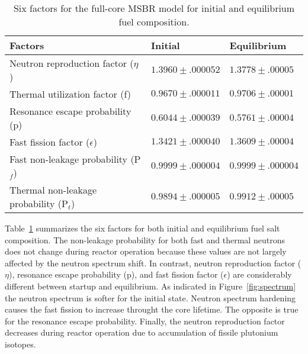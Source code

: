 \begin{table}[ht!]
  \centering
  \caption{Six factors for the full-core \gls{MSBR} model for initial and equilibrium fuel composition.}
\begin{tabular}{| m{} | m{} | m{} |} \hline
	   \qquad\qquad\qquad Factors  & \qquad\qquad Initial      & \qquad Equilibrium   \\ [3pt]\hline   
Neutron reproduction factor ($\eta$)     & $1.3960\pm.000052$     & $1.3778\pm.00005$ \\ [3pt] \hline
Thermal utilization factor (f)           & $0.9670\pm.000011$     & $0.9706\pm.00001$ \\ [3pt] \hline
Resonance escape probability (p)         & $0.6044\pm.000039$     & $0.5761\pm.00004$ \\ [3pt] \hline
Fast fission factor ($\epsilon$)         & $1.3421\pm.000040$     & $1.3609\pm.00004$ \\ [3pt] \hline
Fast non-leakage probability (P$_f$)     & $0.9999\pm.000004$     & $0.9999\pm.000004$ \\ [3pt] \hline
Thermal non-leakage probability (P$_t$)  & $0.9894\pm.000005$     & $0.9912\pm.00005$ \\ [3pt] \hline
\end{tabular}
  \label{tab:six_factor}
\end{table}

Table~\ref{tab:six_factor} summarizes the six factors for both initial and equilibrium fuel salt composition. The non-leakage probability for both fast and thermal neutrons does not change during reactor operation because these values are not largely affected by the neutron spectrum shift. In contrast, neutron reproduction factor ($\eta$), resonance escape probability (p), and fast fission factor ($\epsilon$) are considerably different between startup and equilibrium. As indicated in Figure~\ref{fig:spectrum} the neutron spectrum is softer for the initial state. Neutron spectrum hardening causes the fast fission to increase throught the core lifetime. The opposite is true for the resonance escape probability. Finally, the neutron reproduction factor decreases during reactor operation due to accumulation of fissile plutonium isotopes.


